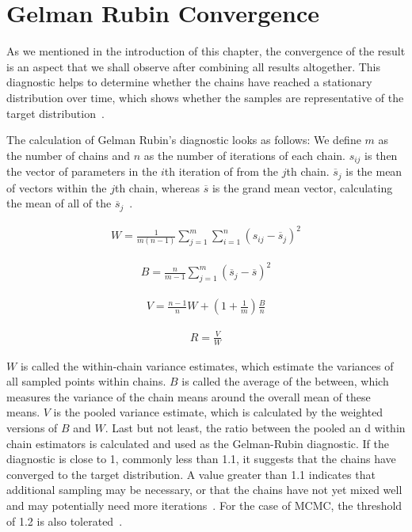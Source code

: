 \section{Gelman Rubin Convergence}
As we mentioned in the introduction of this chapter, the convergence of the result is an aspect that we shall observe after combining all results altogether. This diagnostic helps to determine whether the chains have reached a stationary distribution over time, which shows whether the samples are representative of the target distribution~\cite{gelman_rubin}.

The calculation of Gelman Rubin's diagnostic looks as follows: We define $m$ as the number of chains and $n$ as the number of iterations of each chain. $s_{ij}$ is then the vector of parameters in the $i$th iteration of from the $j$th chain. $\overline{s}_j$ is the mean of vectors within the $j$th chain, whereas $\overline{s}$ is the grand mean vector, calculating the mean of all of the $\overline{s}_j$~\cite{gr_calc}.

\begin{align}
W = \frac 1 {m(n-1)}\sum_{j=1}^m \sum_{i=1}^n (s_{ij} - \overline{s}_j)^2
\end{align}

\begin{align}
B = \frac n {m-1} \sum_{j=1}^m (\overline{s}_j - \overline{s})^2
\end{align}

\begin{align}
V = \frac {n-1}n W + (1 + \frac 1 m)\frac B n
\end{align}

\begin{align}
R = \frac V W
\end{align}

$W$ is called the within-chain variance estimates, which estimate the variances of all sampled points within chains. $B$ is called the average of the between, which measures the variance of the chain means around the overall mean of these means. $V$ is the pooled variance estimate, which is calculated by the weighted versions of $B$ and $W$. Last but not least, the ratio between the pooled an d within chain estimators is calculated and used as the Gelman-Rubin diagnostic. If the diagnostic is close to 1, commonly less than 1.1, it suggests that the chains have converged to the target distribution. A value greater than 1.1 indicates that additional sampling may be necessary, or that the chains have not yet mixed well and may potentially need more iterations~\cite{gr_calc}. For the case of MCMC, the threshold of 1.2 is also tolerated~\cite{gr1.2}.

